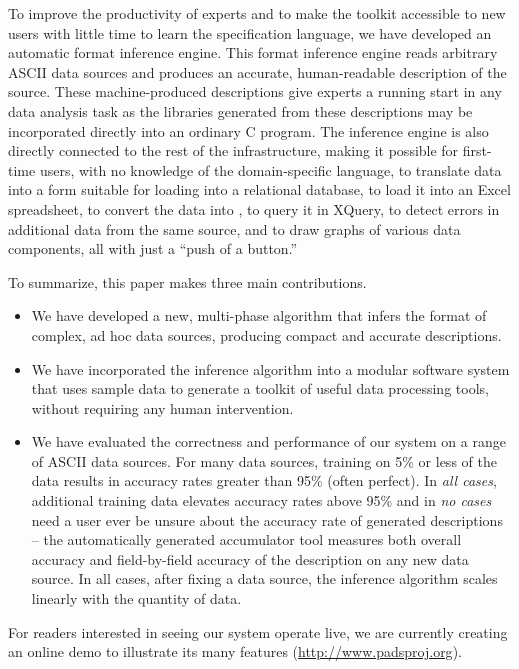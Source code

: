 To improve the productivity of experts and to 
make the \pads{} toolkit accessible to new users with 
little time to learn the specification language,
we have developed an automatic format inference engine.
This format inference engine reads arbitrary ASCII data sources
and produces an accurate, human-readable \pads{} description of the source.
These machine-produced descriptions give experts a running start
in any data analysis task as the libraries generated from these
descriptions may be incorporated directly into an ordinary C program.
The inference engine is also directly connected to the rest of the
\pads{} infrastructure, making it possible for first-time users,
with no knowledge of the \pads{} domain-specific language, 
to translate data into a form suitable for loading into a relational database, 
to load it into an Excel spreadsheet,
to convert the data into \xml{},
to query it in XQuery,
to detect errors in additional data from the same source,
and to draw graphs of various data components, all
with just a ``push of a button.''

To summarize, this paper makes three main contributions.

\begin{itemize}
\item We have developed a new, multi-phase algorithm 
that infers the format of complex, ad hoc data sources,
producing compact and accurate \pads{} descriptions.

\item We have incorporated the inference algorithm into 
a modular software system that uses sample data to
generate a toolkit of useful data processing tools,
without requiring any human intervention.
 
\item We have evaluated the correctness and performance of
our system on a range of ASCII data sources.  For many data
sources, training on 5\% or less of the data results in
accuracy rates greater than 95\% (often perfect).  
In {\em all cases}, additional
training data elevates accuracy rates above 95\% and
in {\em no cases} need a user ever be unsure about the
accuracy rate of generated descriptions -- the automatically
generated accumulator tool measures both overall accuracy
and field-by-field accuracy of the description on any new
data source.
In all cases, after fixing a data source, the 
inference algorithm scales linearly with the quantity of
data.
\end{itemize}
\noindent
For readers interested in seeing our system operate live, we are
currently creating an online demo to illustrate its many features
(\url{http://www.padsproj.org}).


